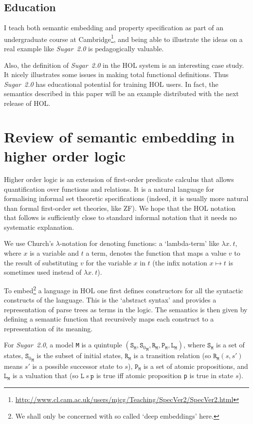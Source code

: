 \documentclass{llncs}
\newcommand\Sugar{{\it{Sugar~2.0}}\xspace}
\newcommand\Hol{HOL\xspace}
\renewcommand{\t}[1]{\texttt{#1}}
\renewcommand{\L}{\texttt{L}\xspace}
\begin{document}
\subsection{Education}

I teach both semantic embedding and property specification as part of an undergraduate course at
Cambridge\footnote{\url{http://www.cl.cam.ac.uk/users/mjcg/Teaching/SpecVer2/SpecVer2.html}},
and being able to illustrate the ideas on a real example like \Sugar is pedagogically valuable.

Also, the definition of \Sugar in the \Hol system is an interesting
case study. It nicely illustrates some issues in making total
functional definitions. Thus \Sugar has educational potential for
training \Hol users. In fact, the semantics described in this paper
will be an example distributed with the next release of \Hol.

\section{Review of semantic embedding in higher order logic}

Higher order logic is an extension of first-order predicate calculus
that allows quantification over functions and relations. It is a
natural language for formalising informal set theoretic specifications
(indeed, it is usually more natural than formal first-order set
theories, like ZF).  We hope that the \Hol notation that follows is
sufficiently close to standard informal notation that it needs no
systematic explanation.

We use Church's $\lambda$-notation for denoting functions: 
a `lambda-term' like $\lambda x.~t$, where $x$
is a variable and $t$ a term, denotes the function 
that maps a value $v$ to the result of substituting $v$ for the
variable $x$ in $t$ (the infix notation $x \mapsto t$ is
sometimes used instead of $\lambda x.~t$).

To embed\footnote{We shall only be concerned with so called `deep
embeddings' here.}  a language in \Hol one first defines constructors
for all the syntactic constructs of the language. This is the
`abstract syntax' and provides a representation of parse trees as
terms in the logic.  The semantics is then given by defining a
semantic function that recursively maps each construct to a
representation of its meaning.

For \Sugar, a model \t{M} is a quintuple
$(\t{S}_{\t{M}},{\t{S}_0}_{\t{M}},\t{R}_{\t{M}},\t{P}_{\t{M}},\t{L}_{\t{M}})$, where $\t{S}_{\t{M}}$
is a set of states, ${\t{S}_0}_{\t{M}}$ is the subset of initial states, $\t{R}_{\t{M}}$ is a
transition relation (so $\t{R}_{\t{M}}(s,s')$ means $s'$ is a possible
successor state to $s$), $\t{P}_{\t{M}}$ is a set of atomic propositions, and
$\L_{\t{M}}$ is a valuation that (so $\L~s~\t{p}$ is true iff atomic proposition
\t{p} is true in state $s$).
\end{document}
